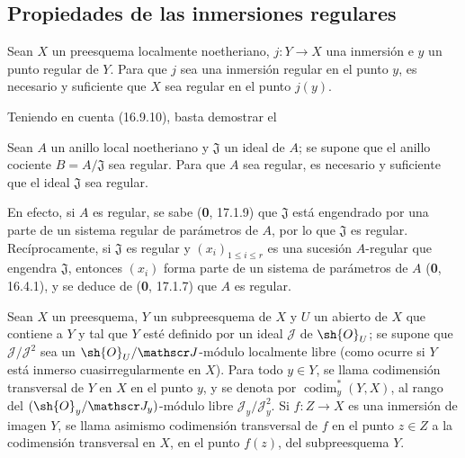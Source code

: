 \subsection{Propiedades de las inmersiones regulares}
\label{subsection:IV.19.1}

\begin{proposition}[19.1.1]
\label{IV.19.1.1}
Sean $X$ un preesquema localmente noetheriano, $j:Y\to X$ una inmersión e $y$ un punto regular de $Y$. Para que $j$ sea una inmersión regular en el punto $y$, es necesario y suficiente que $X$ sea regular en el punto $j(y)$.
\end{proposition}

Teniendo en cuenta (16.9.10), basta demostrar el

\begin{corollary}[19.1.2]
\label{IV.19.1.2}
Sean $A$ un anillo local noetheriano y $\mathfrak J$ un ideal de $A$; se supone que el anillo cociente $B=A/\mathfrak J$ sea regular. Para que $A$ sea regular, es necesario y suficiente que el ideal $\mathfrak J$ sea regular.
\end{corollary}

En efecto, si $A$ es regular, se sabe (\textbf{0}, 17.1.9) que $\mathfrak J$ está engendrado por una parte de un sistema regular de parámetros de $A$, por lo que $\mathfrak J$ es regular. Recíprocamente, si $\mathfrak J$ es regular y $(x_i)_{1\leq i\leq r}$ es una sucesión $A$-regular que engendra $\mathfrak J$, entonces $(x_i)$ forma parte de un sistema de parámetros de $A$ (\textbf{0}, 16.4.1), y se deduce de (\textbf{0}, 17.1.7) que $A$ es regular.

\begin{definition}[19.1.3]
\label{IV.19.1.3}
Sean $X$ un preesquema, $Y$ un subpreesquema de $X$ y $U$ un abierto de $X$ que contiene a $Y$ y tal que $Y$ esté definido por un ideal $\mathscr J$ de $\sh{O}_U$; se supone que $\mathscr J/\mathscr J^2$ sea un $\sh{O}_U/\mathscr J$-módulo localmente libre \textup{(como ocurre si $Y$ está inmerso cuasirregularmente en $X$)}. Para todo $y\in Y$, se llama codimensión transversal de $Y$ en $X$ en el punto $y$, y se denota por $\operatorname{codim}_y^*(Y,X)$, al rango del $(\sh{O}_y/\mathscr J_y)$-módulo libre $\mathscr J_y/\mathscr J_y^2$. Si $f:Z\to X$ es una inmersión de imagen $Y$, se llama asimismo codimensión transversal de $f$ en el punto $z\in Z$ a la codimensión transversal en $X$, en el punto $f(z)$, del subpreesquema $Y$.
\end{definition}

